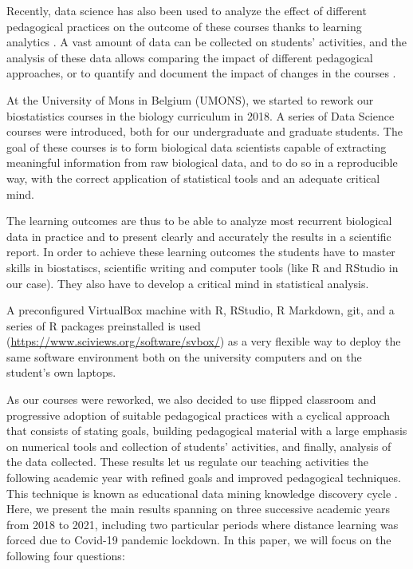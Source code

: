 \documentclass{aims}
\theoremstyle{definition}
\begin{document}
Recently, data science has also been used to analyze the effect of
different pedagogical practices on the outcome of these courses thanks
to learning analytics \cite{Estrellado2020}. A vast amount of data can
be collected on students' activities, and the analysis of these data
allows comparing the impact of different pedagogical approaches, or to
quantify and document the impact of changes in the courses
\cite{Romero2020}.

At the University of Mons in Belgium (UMONS), we started to rework our
biostatistics courses in the biology curriculum in 2018. A series of
Data Science courses were introduced, both for our undergraduate and
graduate students. The goal of these courses is to form biological data
scientists capable of extracting meaningful information from raw
biological data, and to do so in a reproducible way, with the correct
application of statistical tools and an adequate critical mind.

The learning outcomes are thus to be able to analyze most recurrent
biological data in practice and to present clearly and accurately the
results in a scientific report. In order to achieve these learning
outcomes the students have to master skills in biostatiscs, scientific
writing and computer tools (like R and RStudio in our case). They also
have to develop a critical mind in statistical analysis.

A preconfigured VirtualBox machine with R, RStudio, R Markdown, git, and
a series of R packages preinstalled is used
(\url{https://www.sciviews.org/software/svbox/}) as a very flexible way
to deploy the same software environment both on the university computers
and on the student's own laptops.

As our courses were reworked, we also decided to use flipped classroom
and progressive adoption of suitable pedagogical practices with a
cyclical approach that consists of stating goals, building pedagogical
material with a large emphasis on numerical tools and collection of
students' activities, and finally, analysis of the data collected. These
results let us regulate our teaching activities the following academic
year with refined goals and improved pedagogical techniques. This
technique is known as educational data mining knowledge discovery cycle
\cite{Romero2020}. Here, we present the main results spanning on three
successive academic years from 2018 to 2021, including two particular
periods where distance learning was forced due to Covid-19 pandemic
lockdown. In this paper, we will focus on the following four questions:
\end{document}
